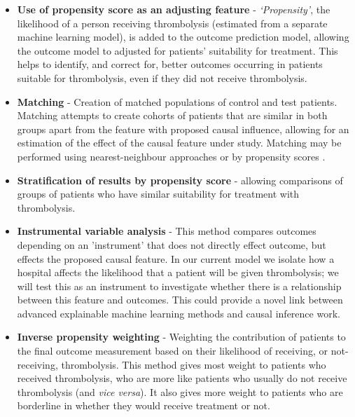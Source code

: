 \begin{itemize}
    \item \textbf{Use of propensity score as an adjusting feature} \cite{rosenbaum_central_1983} - \textit{`Propensity'}, the likelihood of a person receiving thrombolysis (estimated from a separate machine learning model), is added to the outcome prediction model, allowing the outcome model to adjusted for patients' suitability for treatment. This helps to identify, and correct for, better outcomes occurring in patients suitable for thrombolysis, even if they did not receive thrombolysis.

    \item \textbf{Matching} - Creation of matched populations of control and test patients. Matching attempts to create cohorts of patients that are similar in both groups apart from the feature with proposed causal influence, allowing for an estimation of the effect of the causal feature under study. Matching may be performed using nearest-neighbour approaches \cite{stuart_matching_2010} or by propensity scores \cite{rosenbaum_central_1983}.

    \item \textbf{Stratification of results by propensity score} \cite{rosenbaum_central_1983} - allowing comparisons of groups of patients who have similar suitability for treatment with thrombolysis.

    \item \textbf{Instrumental variable analysis} \cite{stel_instrumental_2013} - This method compares outcomes depending on an 'instrument' that does not directly effect outcome, but effects the proposed causal feature. In our current model we isolate how a hospital affects the likelihood that a patient will be given thrombolysis; we will test this as an instrument to investigate whether there is a relationship between this feature and outcomes. This could provide a novel link between advanced explainable machine learning methods and causal inference work.
           
    \item \textbf{Inverse propensity weighting} \cite{glynn_introduction_2010} - Weighting the contribution of patients to the final outcome measurement based on their likelihood of receiving, or not-receiving, thrombolysis. This method gives most weight to patients who received thrombolysis, who are more like patients who usually do not receive thrombolysis (and \textit{vice versa}). It also gives more weight to patients who are borderline in whether they would receive treatment or not.   
       

\end{itemize}
